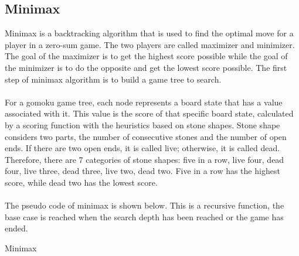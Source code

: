 \subsection{Minimax}
Minimax is a backtracking algorithm that is used to find the optimal move for a player in a zero-sum game. The two players are called maximizer and minimizer. The goal of the maximizer is to get the highest score possible while the goal of the minimizer is to do the opposite and get the lowest score possible. The first step of minimax algorithm is to build a game tree to search.\\
\\
For a gomoku game tree, each node represents a board state that has a value associated with it. This value is the score of that specific board state, calculated by a scoring function with the heuristics based on stone shapes. Stone shape considers two parts, the number of consecutive stones and the number of open ends. If there are two open ends, it is called live; otherwise, it is called dead. Therefore, there are 7 categories of stone shapes: five in a row, live four, dead four, live three, dead three, live two, dead two. Five in a row has the highest score, while dead two has the lowest score.\\
\\
The pseudo code of minimax is shown below. This is a recursive function, the base case is reached when the search depth has been reached or the game has ended.\\

\begin{algorithm}[!htbp]
\SetAlgoLined
{}

\caption{Minimax}
\label{alg:minimax}
\end{algorithm}


